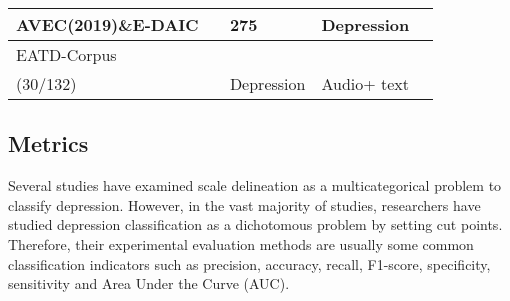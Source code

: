 \begin{table*}
\begin{tabularx}{19cm}{X|X|X|X}
AVEC(2019)\&E-DAIC ~\cite{ringeval2019avec}                                                                                                                                                                       &275                                                                                                                    & Depression          &
\\
\hline
EATD-Corpus ~\cite{2022Automatic}                                                            & \begin{tabular}[c]{@{}l@{}}162    \\ (30/132)\end{tabular}                                                        & Depression          &Audio+ text                                \\          
	\hline              
\end{tabularx}
\end{table*}

\ifx\allfiles\undefined

\fi

\subsection{Metrics}
Several studies have examined scale delineation as a multicategorical problem to classify depression. However, in the vast majority of studies, researchers have studied depression classification as a dichotomous problem by setting cut points. Therefore, their experimental evaluation methods are usually some common classification indicators such as precision, accuracy, recall, F1-score, specificity,  sensitivity and Area Under the Curve (AUC). 

